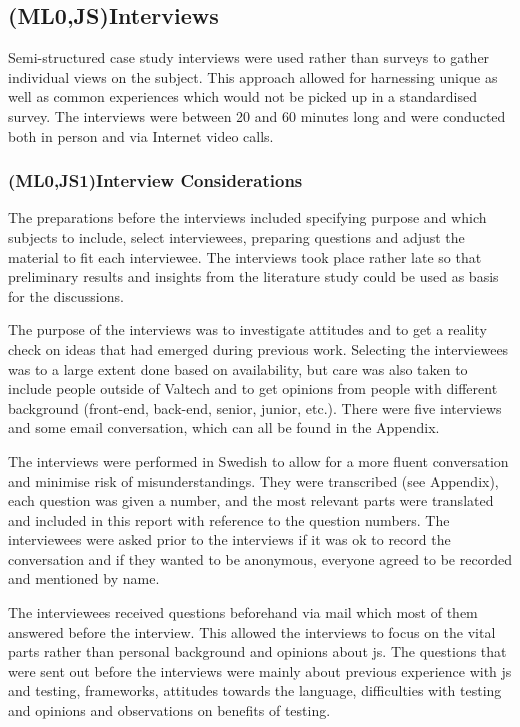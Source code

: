 \documentclass[11pt]{article}
\begin{document}
\subsection{(ML0,JS)Interviews}

Semi-structured case study interviews were used rather than surveys to gather individual views on the subject. This approach allowed for harnessing unique as well as common experiences which would not be picked up in a standardised survey. The interviews were between 20 and 60 minutes long and were conducted both in person and via Internet video calls.

\subsubsection{(ML0,JS1)Interview Considerations}

The preparations before the interviews included specifying purpose and which subjects to include, select interviewees, preparing questions and adjust the material to fit each interviewee. The interviews took place rather late so that preliminary results and insights from the literature study could be used as basis for the discussions.

The purpose of the interviews was to investigate attitudes and to get a reality check on ideas that had emerged during previous work. Selecting the interviewees was to a large extent done based on availability, but care was also taken to include people outside of Valtech and to get opinions from people with different background (front-end, back-end, senior, junior, etc.). There were five interviews and some email conversation, which can all be found in the Appendix.

The interviews were performed in Swedish to allow for a more fluent conversation and minimise risk of misunderstandings. They were transcribed (see Appendix), each question was given a number, and the most relevant parts were translated and included in this report with reference to the question numbers. The interviewees were asked prior to the interviews if it was ok to record the conversation and if they wanted to be anonymous, everyone agreed to be recorded and mentioned by name.

The interviewees received questions beforehand via mail which most of them answered before the interview. This allowed the interviews to focus on the vital parts rather than personal background and opinions about \gls{js}. The questions that were sent out before the interviews were mainly about previous experience with \gls{js} and testing, frameworks, attitudes towards the language, difficulties with testing and opinions and observations on benefits of testing.
\end{document}
